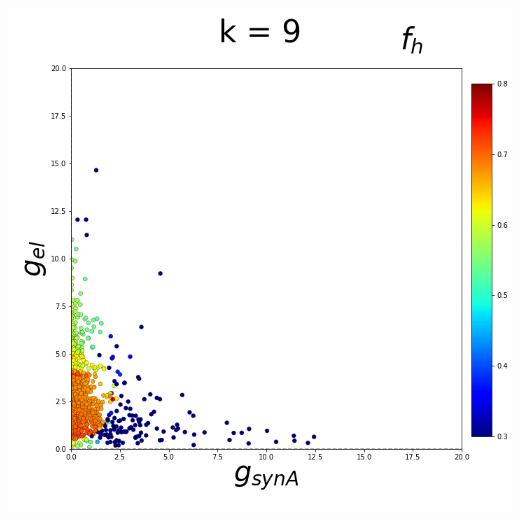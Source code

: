 \documentclass[11pt]{article}
\begin{document}
\begin{center}
\includegraphics[scale=0.125]{DSN_figs/STGCircuit_DSN_c=0_rs=1_k=9.png}
\end{center}
\end{document}

